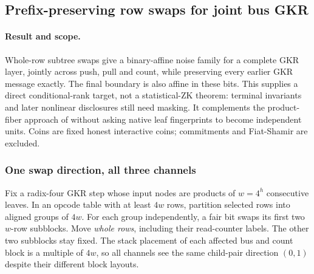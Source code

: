 \subsection{Prefix-preserving row swaps for joint bus GKR}\label{note:zk-subtree-swaps}

\paragraph{Result and scope.} Whole-row subtree swaps give a binary-affine noise family for a complete GKR layer, jointly across push, pull and count, while preserving every earlier GKR message exactly. The final boundary is also affine in these bits. This supplies a direct conditional-rank target, not a statistical-ZK theorem: terminal invariants and later nonlinear disclosures still need masking. It complements the product-fiber approach of  without asking native leaf fingerprints to become independent units. Coins are fixed honest interactive coins; commitments and Fiat-Shamir are excluded.

\subsubsection{One swap direction, all three channels}

Fix a radix-four GKR step whose input nodes are products of $w=4^h$ consecutive leaves. In an opcode table with at least $4w$ rows, partition selected rows into aligned groups of $4w$. For each group independently, a fair bit swaps its first two $w$-row subblocks. Move \emph{whole rows}, including their read-counter labels. The other two subblocks stay fixed. The stack placement of each affected bus and count block is a multiple of $4w$, so all channels see the same child-pair direction $(0,1)$ despite their different block layouts.

